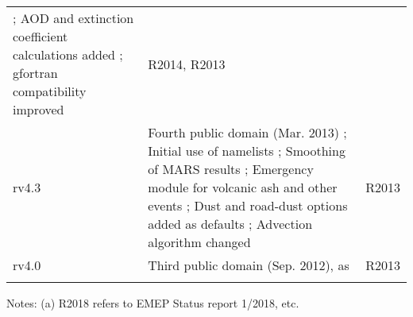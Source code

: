 \begin{table}
\begin{footnotesize}
\begin{tabular}{lp{11cm}l}
       ; AOD and extinction coefficient calculations added %
       ; gfortran compatibility improved            %
                  & R2014, R2013\\
rv4.3   & Fourth public domain (Mar. 2013)  %
       ; Initial use of namelists           %
       ; Smoothing of MARS results         %
       ; Emergency module for volcanic ash and other events%
       ; Dust and road-dust options added as defaults %
       ; Advection algorithm changed  %
             & R2013\\ 
rv4.0   & Third public domain (Sep. 2012), as \citet{Simpson_et_al:EMEP}            & R2013\\ 
        &                                                &\\
\hline
\end{tabular}
Notes: (a) R2018 refers to EMEP Status report 1/2018, etc.
\end{footnotesize}
\end{table}

